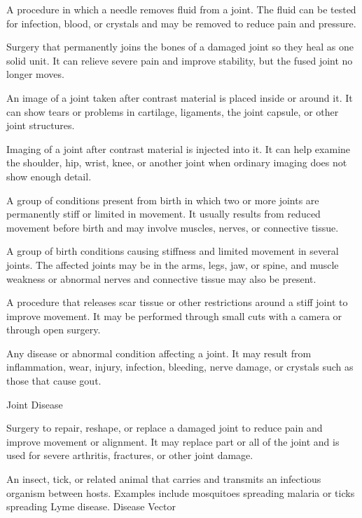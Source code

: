  A procedure in which a needle removes fluid from a joint. The fluid can be tested for infection, blood, or crystals and may be removed to reduce pain and pressure.

 Surgery that permanently joins the bones of a damaged joint so they heal as one solid unit. It can relieve severe pain and improve stability, but the fused joint no longer moves.

 An image of a joint taken after contrast material is placed inside or around it. It can show tears or problems in cartilage, ligaments, the joint capsule, or other joint structures.

 Imaging of a joint after contrast material is injected into it. It can help examine the shoulder, hip, wrist, knee, or another joint when ordinary imaging does not show enough detail.

 A group of conditions present from birth in which two or more joints are permanently stiff or limited in movement. It usually results from reduced movement before birth and may involve muscles, nerves, or connective tissue.

 A group of birth conditions causing stiffness and limited movement in several joints. The affected joints may be in the arms, legs, jaw, or spine, and muscle weakness or abnormal nerves and connective tissue may also be present.

 A procedure that releases scar tissue or other restrictions around a stiff joint to improve movement. It may be performed through small cuts with a camera or through open surgery.

 Any disease or abnormal condition affecting a joint. It may result from inflammation, wear, injury, infection, bleeding, nerve damage, or crystals such as those that cause gout.

\synonyms
Joint Disease

 Surgery to repair, reshape, or replace a damaged joint to reduce pain and improve movement or alignment. It may replace part or all of the joint and is used for severe arthritis, fractures, or other joint damage.

 An insect, tick, or related animal that carries and transmits an infectious organism between hosts. Examples include mosquitoes spreading malaria or ticks spreading Lyme disease.
\synonyms
Disease Vector

